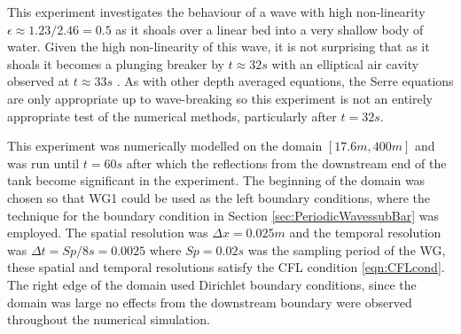 This experiment investigates the behaviour of a wave with high non-linearity $ \epsilon \approx 1.23/2.46 = 0.5$ as it shoals over a linear bed into a very shallow body of water. Given the high non-linearity of this wave, it is not surprising that as it shoals it becomes a plunging breaker by $t \approx 32s$ with an elliptical air cavity observed at $t \approx 33s$ \cite{Roeber-2010}. As with other depth averaged equations, the Serre equations are only appropriate up to wave-breaking so this experiment is not an entirely appropriate test of the numerical methods, particularly after $t=32s$.

This experiment was numerically modelled on the domain $[17.6m , 400m]$ and was run until $t = 60s$ after which the reflections from the downstream end of the tank become significant in the experiment. The beginning of the domain was chosen so that WG1 could be used as the left boundary conditions, where the technique for the boundary condition in Section \ref{sec:PeriodicWavessubBar} was employed. The spatial resolution was $\Delta x = 0.025m$ and the temporal resolution was $\Delta t = Sp / 8 s = 0.0025$ where $Sp = 0.02s$ was the sampling period of the WG, these spatial and temporal resolutions satisfy the CFL condition \eqref{eqn:CFLcond}. The right edge of the domain used Dirichlet boundary conditions, since the domain was large no effects from the downstream boundary were observed throughout the numerical simulation. 

